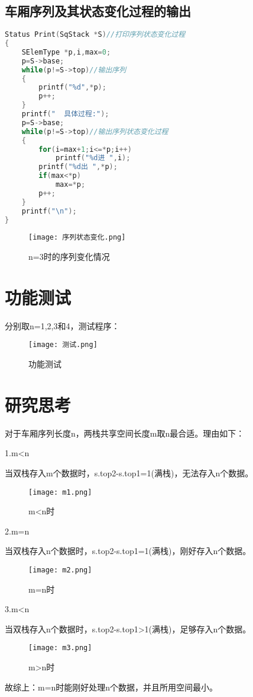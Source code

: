 \documentclass{DateStructure}
\begin{document}
\subsection{车厢序列及其状态变化过程的输出}
\begin{lstlisting}[language=C,caption={打印函数}]
Status Print(SqStack *S)//打印序列状态变化过程
{
    SElemType *p,i,max=0;
	p=S->base;
	while(p!=S->top)//输出序列
	{
		printf("%d",*p);
		p++;
	}
    printf("  具体过程:");
    p=S->base;
    while(p!=S->top)//输出序列状态变化过程
	{
        for(i=max+1;i<=*p;i++)
            printf("%d进 ",i);
        printf("%d出 ",*p);
        if(max<*p)
            max=*p;
		p++;
	}
	printf("\n");
}
\end{lstlisting}	
\begin{figure}[H] 
\centering
\texttt{[image: 序列状态变化.png]}
\caption{n=3时的序列变化情况}
\end{figure}

\section{功能测试}
分别取n=1,2,3和4，测试程序：\par
\begin{figure}[H] 
\centering
\texttt{[image: 测试.png]}
\caption{功能测试}
\end{figure}

\section{研究思考}
对于车厢序列长度n，两栈共享空间长度m取n最合适。理由如下：\par
1.m<n\par
当双栈存入m个数据时，s.top2-s.top1=1(满栈)，无法存入n个数据。\par
\begin{figure}[H] 
\centering
\texttt{[image: m1.png]}
\caption{m<n时}
\end{figure}
2.m=n\par
当双栈存入n个数据时，s.top2-s.top1=1(满栈)，刚好存入n个数据。\par
\begin{figure}[H] 
\centering
\texttt{[image: m2.png]}
\caption{m=n时}
\end{figure}
3.m<n\par
当双栈存入n个数据时，s.top2-s.top1>1(满栈)，足够存入n个数据。\par
\begin{figure}[H] 
\centering
\texttt{[image: m3.png]}
\caption{m>n时}
\end{figure}
故综上：m=n时能刚好处理n个数据，并且所用空间最小。\par
\end{document}
